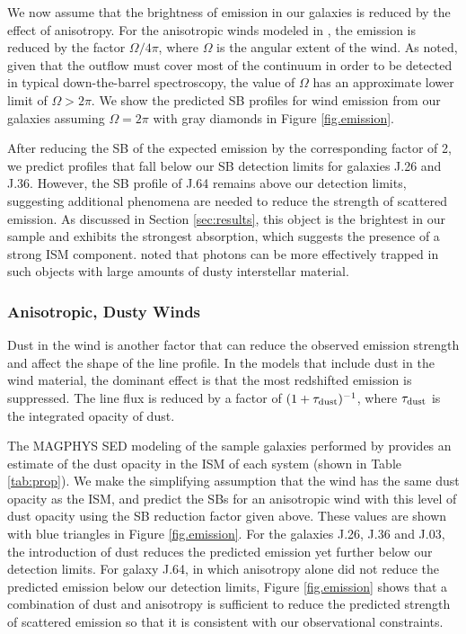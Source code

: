 \documentclass[twocolumn]{aastex62}
\begin{document}
We now assume that the brightness of emission in our galaxies is reduced by the effect of anisotropy. For the anisotropic winds modeled in \cite{Prochaska_2011}, the emission is reduced by the factor $\Omega/4\pi$, where $\Omega$ is the angular extent of the wind. As \citet{Prochaska_2011} noted, given that the outflow must cover most of the continuum in order to be detected in typical down-the-barrel spectroscopy, the value of $\Omega$ has an approximate lower limit of $\Omega > 2\pi$. We show the predicted SB profiles for wind emission from our galaxies assuming  $\Omega = 2\pi$ with gray diamonds in Figure  \ref{fig.emission}.

After reducing the SB of the expected  emission by the corresponding factor of 2, we predict profiles that fall below our SB detection limits for galaxies J.26 and J.36. However, the SB profile of J.64 remains above our detection limits, suggesting additional phenomena are needed to reduce the strength of scattered emission. As discussed in Section \ref{sec:results}, this object is the brightest in our sample and exhibits the strongest  absorption, which suggests the presence of a strong ISM component. \cite{Prochaska_2011} noted that  photons can be more effectively trapped in such objects with large amounts of dusty interstellar material. 

\subsubsection{Anisotropic, Dusty Winds}

Dust in the wind is another factor that can reduce the observed emission strength and affect the shape of the  line profile. 
In the \cite{Prochaska_2011} models that include dust in the wind material, the dominant effect is that the most redshifted emission is suppressed. The line flux is reduced by a factor of $(1+\tau_{\rm{dust}})^{-1}$, where $\tau_{\rm{dust}}$ is the integrated opacity of dust. 

The MAGPHYS SED modeling of the sample galaxies performed by \cite{Rubin_2014} provides an
estimate of the dust opacity in the ISM of each system (shown in Table \ref{tab:prop}). %
We make the simplifying assumption
that the wind has the same dust opacity as the ISM, and predict the SBs for an anisotropic wind with this level of dust opacity using the SB reduction factor given above.  These values are shown with blue triangles in Figure \ref{fig.emission}.
For the galaxies J.26, J.36 and J.03, the introduction of dust reduces the predicted emission yet further below our detection limits. For galaxy J.64, in which anisotropy alone did not reduce the predicted emission below our detection limits, Figure \ref{fig.emission} shows that a combination of dust and anisotropy is sufficient to reduce the predicted strength of scattered emission %
so that it is consistent with our observational constraints.
\end{document}
